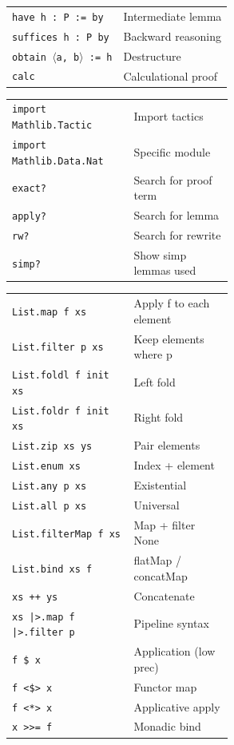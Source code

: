 \documentclass[10pt]{extarticle}
\begin{document}
\begin{multicols}{2}
\begin{tabularx}{\linewidth}{@{}l@{\enspace}Y@{}}
\texttt{have h : P := by}    & Intermediate lemma \\
\texttt{suffices h : P by}   & Backward reasoning \\
\texttt{obtain $\langle$a, b$\rangle$ := h}  & Destructure \\
\texttt{calc}                 & Calculational proof \\
\end{tabularx}

\begin{tabularx}{\linewidth}{@{}>{\raggedright\arraybackslash}p{0.55\linewidth}@{\enspace}Y@{}}
\texttt{import Mathlib.Tactic} & Import tactics \\
\texttt{import Mathlib.Data.Nat} & Specific module \\
\texttt{exact?}                & Search for proof term \\
\texttt{apply?}                & Search for lemma \\
\texttt{rw?}                   & Search for rewrite \\
\texttt{simp?}                 & Show simp lemmas used \\
\end{tabularx}

\begin{tabularx}{\linewidth}{@{}>{\raggedright\arraybackslash}p{0.55\linewidth}@{\enspace}Y@{}}
\texttt{List.map f xs}              & Apply f to each element \\
\texttt{List.filter p xs}           & Keep elements where p \\
\texttt{List.foldl f init xs}       & Left fold \\
\texttt{List.foldr f init xs}       & Right fold \\
\texttt{List.zip xs ys}             & Pair elements \\
\texttt{List.enum xs}               & Index + element \\
\texttt{List.any p xs}              & Existential \\
\texttt{List.all p xs}              & Universal \\
\texttt{List.filterMap f xs}        & Map + filter None \\
\texttt{List.bind xs f}             & flatMap / concatMap \\
\texttt{xs ++ ys}                   & Concatenate \\
\texttt{xs |>.map f |>.filter p}    & Pipeline syntax \\
\texttt{f \$ x}                     & Application (low prec) \\
\texttt{f <\$> x}                   & Functor map \\
\texttt{f <*> x}                    & Applicative apply \\
\texttt{x >>= f}                    & Monadic bind \\
\end{tabularx}


\end{multicols}
\end{document}

